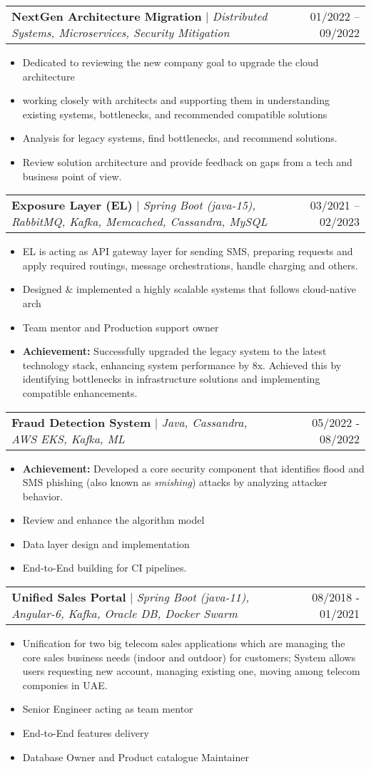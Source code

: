 \documentclass[letterpaper,11pt]{article}
\makeatletter
\newcommand{\resumeItem}[1]{
  \item\small{
    {#1 \vspace{-2pt}}
  }
}
\newcommand{\resumeProjectHeading}[2]{
    \item
    \begin{tabular*}{0.97\textwidth}{l@{\extracolsep{\fill}}r}
      \small#1 & #2 \\
    \end{tabular*}\vspace{-7pt}
}
\newcommand{\resumeItemListStart}{\begin{itemize}}
\newcommand{\resumeItemListEnd}{\end{itemize}\vspace{-5pt}}
\makeatother
\begin{document}
        \resumeProjectHeading
        {\textbf{NextGen Architecture Migration} $|$ \footnotesize\emph{Distributed Systems, Microservices, Security Mitigation}}
        {01/2022 -- 09/2022}
        \resumeItemListStart
            \resumeItem{Dedicated to reviewing the new company goal to upgrade the cloud architecture}
            \resumeItem{working closely with architects and supporting them in understanding existing systems, bottlenecks, and recommended compatible solutions}
            \resumeItem{Analysis for legacy systems, find bottlenecks, and recommend solutions.}
            \resumeItem{Review solution architecture and provide feedback on gaps from a tech and business point of view. }
          \resumeItemListEnd

        \resumeProjectHeading
        {\textbf{Exposure Layer (EL)} $|$ \footnotesize\emph{Spring Boot (java-15), RabbitMQ, Kafka, Memcached, Cassandra, MySQL}}
        {03/2021 -- 02/2023}
        \resumeItemListStart
            \resumeItem{EL is acting as API gateway layer for sending SMS, preparing requests and apply required routings, message orchestrations, handle charging and others.}
            \resumeItem{Designed \& implemented a highly scalable systems that follows cloud-native arch}
            \resumeItem{Team mentor and Production support owner}
            \resumeItem{\textbf{Achievement:} Successfully upgraded the legacy system to the latest technology stack, enhancing system performance by 8x. Achieved this by identifying bottlenecks in infrastructure solutions and implementing compatible enhancements. }
          \resumeItemListEnd
          
      \resumeProjectHeading
        {\textbf{Fraud Detection System} $|$ \footnotesize\emph{Java, Cassandra, AWS EKS, Kafka, ML}}{05/2022 - 08/2022}
        \resumeItemListStart
            \resumeItem{\textbf{Achievement:} Developed a core security component that identifies flood and SMS phishing (also known as \textit{smishing}) attacks by analyzing attacker behavior.}
            \resumeItem{Review and enhance the algorithm model}
            \resumeItem{Data layer design and implementation}
            \resumeItem{End-to-End building for CI pipelines.}
        \resumeItemListEnd

      \resumeProjectHeading
        {\textbf{Unified Sales Portal} $|$ \footnotesize\emph{Spring Boot (java-11), Angular-6, Kafka, Oracle DB, Docker Swarm}}
        {08/2018 - 01/2021}
        \resumeItemListStart
            \resumeItem{Unification for two big telecom sales applications which are managing the core sales business needs (indoor and outdoor) for customers; System allows users requesting new account, managing existing one, moving among telecom componies in UAE.}
            \resumeItem{Senior Engineer acting as team mentor}
            \resumeItem{End-to-End features delivery}
            \resumeItem{Database Owner and Product catalogue Maintainer}
        \resumeItemListEnd
\end{document}
